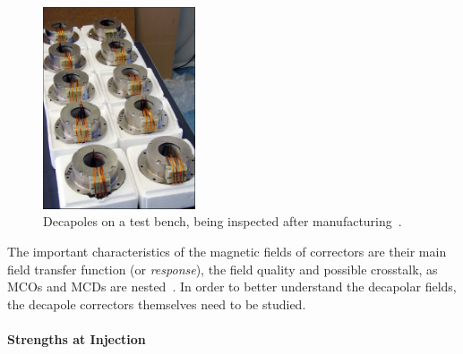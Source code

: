 \begin{figure}
    \centering
    \includegraphics[width=0.4\textwidth]{./images/decapoles_real_pic.jpg}
    \caption{Decapoles on a test bench, being inspected after
    manufacturing~\cite{noauthor_ten_2001}.}
    \label{fig:decapoles:decapole_picture}
\end{figure}


The important characteristics of the magnetic fields of correctors are their main field transfer
function (or \textit{response}), the field quality and possible crosstalk, as MCOs and MCDs are
nested~\cite{venturini_delsolaro_magnetic_2005}.
In order to better understand the decapolar fields, the decapole correctors themselves need to be
studied.


\paragraph{Strengths at Injection}

